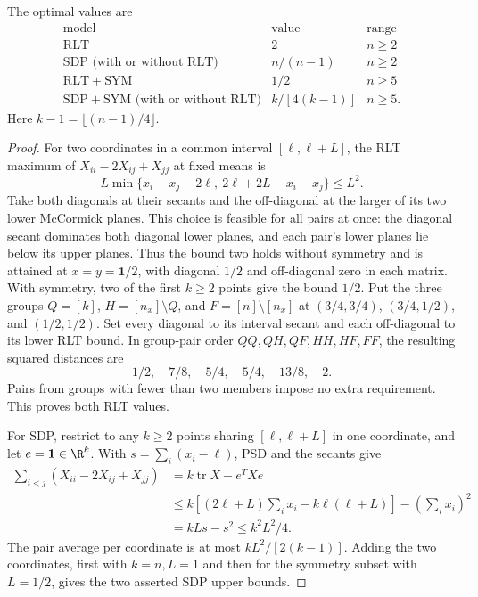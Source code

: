 \begin{proposition}\label{prop:packing-values}
The optimal values are
\[
\begin{array}{c|c|c}
\text{model}&\text{value}&\text{range}\\\hline
\mathrm{RLT}&2&n\ge2\\
\mathrm{SDP}\text{ (with or without RLT)}&n/(n-1)&n\ge2\\
\mathrm{RLT+SYM}&1/2&n\ge5\\
\mathrm{SDP+SYM}\text{ (with or without RLT)}&k/[4(k-1)]&n\ge5.
\end{array}
\]
Here $k-1=\lfloor(n-1)/4\rfloor$.
\end{proposition}
\begin{proof}
For two coordinates in a common interval $[\ell,\ell+L]$, the RLT
maximum of $X_{ii}-2X_{ij}+X_{jj}$ at fixed means is
\[
 L\min\{x_i+x_j-2\ell,\ 2\ell+2L-x_i-x_j\}\le L^2.
\]
Take both diagonals at their secants and the off-diagonal at the larger
of its two lower McCormick planes. This choice is feasible for all pairs at once: the diagonal secant dominates both
diagonal lower planes, and each pair's lower planes lie below its upper
planes. Thus the bound two holds without symmetry and is attained at
$x=y=\boldsymbol1/2$, with diagonal $1/2$ and off-diagonal zero in each
matrix.
With symmetry, two of the first $k\ge2$ points give the bound $1/2$.
Put the three groups $Q=[k]$, $H=[n_x]\setminus Q$, and
$F=[n]\setminus[n_x]$ at $(3/4,3/4)$, $(3/4,1/2)$, and $(1/2,1/2)$.
Set every diagonal to its interval secant and each off-diagonal to its
lower RLT bound. In group-pair order $QQ,QH,QF,HH,HF,FF$, the resulting
squared distances are
\[
 1/2,\quad7/8,\quad5/4,\quad5/4,\quad13/8,\quad2.
\]
Pairs from groups with fewer than two members impose no extra requirement.
This proves both RLT values.

For SDP, restrict to any $k\ge2$ points sharing $[\ell,\ell+L]$ in one
coordinate, and let $e=\boldsymbol1\in\R^k$. With
$s=\sum_i(x_i-\ell)$, PSD and the secants give
\begin{align*}
 \sum_{i<j}(X_{ii}-2X_{ij}+X_{jj})
 &=k\operatorname{tr}X-e^TXe\\
 &\le k[(2\ell+L)\sum_i x_i-k\ell(\ell+L)]-(\sum_i x_i)^2\\
 &=kLs-s^2\le k^2L^2/4.
\end{align*}
The pair average per coordinate is at most $kL^2/[2(k-1)]$.
Adding the two coordinates, first with $k=n,L=1$ and then for the
symmetry subset with $L=1/2$, gives the two asserted SDP upper bounds.


\end{proof}
